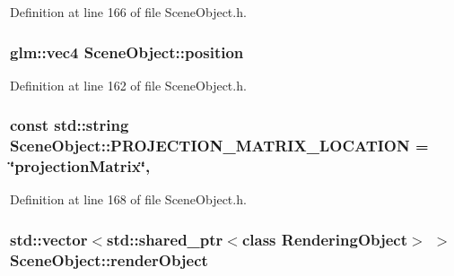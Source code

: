 Definition at line 166 of file Scene\+Object.\+h.

\hypertarget{class_scene_object_ab4aa9bed778001970c38ea11ef34b285}{}
\subsubsection[{position}]{\setlength{\rightskip}{0pt plus 5cm}glm\+::vec4 Scene\+Object\+::position\hspace{0.3cm}{\ttfamily [protected]}}\label{class_scene_object_ab4aa9bed778001970c38ea11ef34b285}


Definition at line 162 of file Scene\+Object.\+h.

\hypertarget{class_scene_object_ad9a8c9c39a4a262c5e379c0bda184541}{}
\subsubsection[{P\+R\+O\+J\+E\+C\+T\+I\+O\+N\+\_\+\+M\+A\+T\+R\+I\+X\+\_\+\+L\+O\+C\+A\+T\+I\+O\+N}]{\setlength{\rightskip}{0pt plus 5cm}const std\+::string Scene\+Object\+::\+P\+R\+O\+J\+E\+C\+T\+I\+O\+N\+\_\+\+M\+A\+T\+R\+I\+X\+\_\+\+L\+O\+C\+A\+T\+I\+O\+N = \char`\"{}projection\+Matrix\char`\"{}\hspace{0.3cm}{\ttfamily [static]}, {\ttfamily [protected]}}\label{class_scene_object_ad9a8c9c39a4a262c5e379c0bda184541}


Definition at line 168 of file Scene\+Object.\+h.

\hypertarget{class_scene_object_a4bbf98a19bd8e7ddd491fbb9a41b42cf}{}
\subsubsection[{render\+Object}]{\setlength{\rightskip}{0pt plus 5cm}std\+::vector$<$std\+::shared\+\_\+ptr$<$class {\bf Rendering\+Object}$>$ $>$ Scene\+Object\+::render\+Object\hspace{0.3cm}{\ttfamily [private]}}\label{class_scene_object_a4bbf98a19bd8e7ddd491fbb9a41b42cf}


